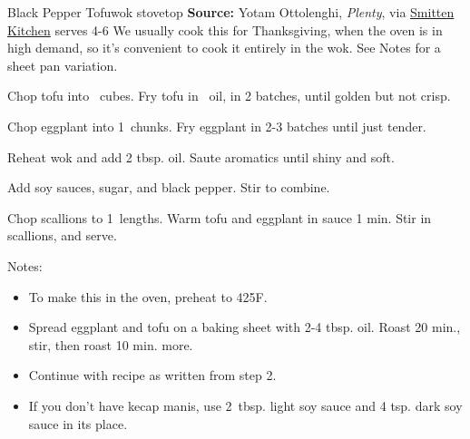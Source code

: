 \begin{recipe}{Black Pepper Tofu}{wok \hfill stovetop \hfill}{\textbf{Source:} Yotam Ottolenghi, \textit{Plenty}, via \href{https://smittenkitchen.com/2019/08/black-pepper-tofu-and-eggplant/}{Smitten Kitchen} \hfill serves 4-6}
  \freeform We usually cook this for Thanksgiving, when the oven is in high demand, so it's convenient to cook it entirely in the wok. See Notes for a sheet pan variation.

Chop tofu into \inch\ cubes. Fry tofu in \inch\ oil, in 2 batches, until golden but not crisp.

Chop eggplant into 1\inch\ chunks. Fry eggplant in 2-3 batches until just tender.

Reheat wok and add 2 tbsp. oil. Saute aromatics until shiny and soft.

Add soy sauces, sugar, and black pepper. Stir to combine.

Chop scallions to 1\inch\ lengths. Warm tofu and eggplant in sauce 1 min. Stir in scallions, and serve.

  \freeform Notes:
  \begin{itemize}
    \item To make this in the oven, preheat to 425\0F.
    \item Spread eggplant and tofu on a baking sheet with 2-4 tbsp. oil. Roast 20 min., stir, then roast 10 min. more.
    \item Continue with recipe as written from step 2.
    \item If you don't have kecap manis, use 2\ tbsp. light soy sauce and 4 tsp. dark soy sauce in its place.
  \end{itemize}
\end{recipe}